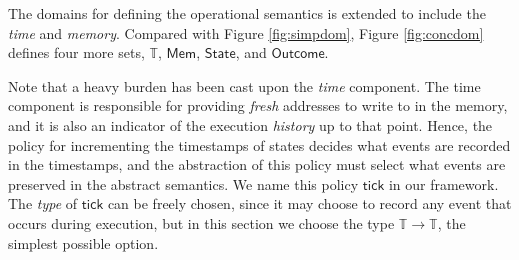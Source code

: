 \documentclass[acmsmall,screen,review]{acmart}\settopmatter{printfolios=true,printccs=false,printacmref=false}
\newcommand*{\Time}{\mathbb{T}}
\newcommand*{\Mem}{\mathsf{Mem}}
\newcommand*{\State}{\mathsf{State}}
\newcommand*{\Outcome}{\mathsf{Outcome}}
\newcommand*{\tick}{\mathsf{tick}}
\begin{document}
The domains for defining the operational semantics is extended to include the \emph{time} and \emph{memory}.
Compared with Figure \ref{fig:simpdom}, Figure \ref{fig:concdom} defines four more sets, $\Time$, $\Mem$, $\State$, and $\Outcome$.

Note that a heavy burden has been cast upon the \emph{time} component.
The time component is responsible for providing \emph{fresh} addresses to write to in the memory, and it is also an indicator of the execution \emph{history} up to that point.
Hence, the policy for incrementing the timestamps of states decides what events are recorded in the timestamps, and the abstraction of this policy must select what events are preserved in the abstract semantics.
We name this policy $\tick$ in our framework.
The \emph{type} of $\tick$ can be freely chosen, since it may choose to record any event that occurs during execution, but in this section we choose the type $\Time\rightarrow\Time$, the simplest possible option.
\end{document}
